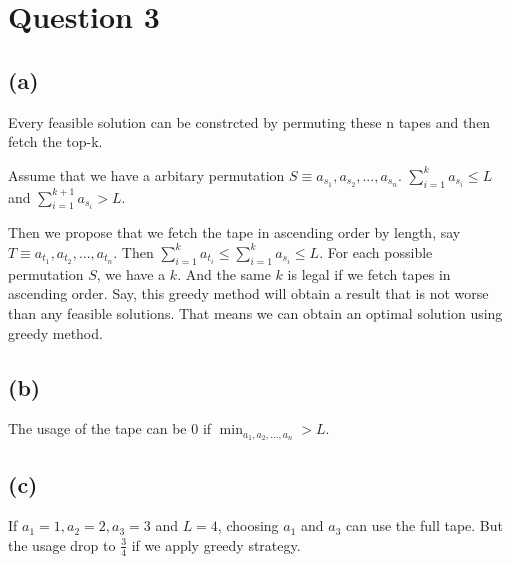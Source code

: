 \documentclass{article}
\newcommand{\question}[1]{\section*{Question #1}}
\renewcommand{\part}[1]{\subsection*{(#1)}}
\begin{document}
\question{3}
\part{a}
Every feasible solution can be constrcted by permuting these n tapes and then fetch the top-k. \par
Assume that we have a arbitary permutation $S \equiv a_{s_1}, a_{s_2}, ..., a_{s_n}$. $\displaystyle\sum_{i = 1}^{k} a_{s_i} \leq L$ and $\displaystyle\sum_{i = 1}^{k + 1} a_{s_i} > L$. \par
Then we propose that we fetch the tape in ascending order by length, say $T \equiv a_{t_1}, a_{t_2}, ..., a_{t_n}$. Then $\displaystyle\sum_{i = 1}^k a_{t_i} \leq \displaystyle\sum_{i = 1}^k a_{s_i} \leq L$. For each possible permutation $S$, we have a $k$. And the same $k$ is legal if we fetch tapes in ascending order. Say, this greedy method will obtain a result that is not worse than any feasible solutions. That means we can obtain an optimal solution using greedy method.
\part{b}
The usage of the tape can be 0 if $\displaystyle\min_{a_1, a_2, ..., a_n} > L$.
\part{c}
If $a_1 = 1, a_2 = 2, a_3 = 3$ and $L = 4$, choosing $a_1$ and $a_3$ can use the full tape. But the usage drop to $\frac{3}{4}$ if we apply greedy strategy.
\end{document}
